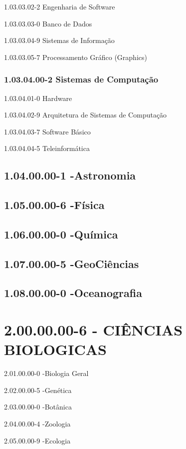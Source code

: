 1.03.03.02-2 Engenharia de Software

1.03.03.03-0 Banco de Dados

1.03.03.04-9 Sistemas de Informação

1.03.03.05-7 Processamento Gráfico (Graphics)

\subsubsection*{1.03.04.00-2 Sistemas de Computação}

1.03.04.01-0 Hardware

1.03.04.02-9 Arquitetura de Sistemas de Computação

1.03.04.03-7 Software Básico

1.03.04.04-5 Teleinformática

\subsection*{1.04.00.00-1 -Astronomia}

\subsection*{1.05.00.00-6 -Física}

\subsection*{1.06.00.00-0 -Química}

\subsection*{1.07.00.00-5 -GeoCiências}

\subsection*{1.08.00.00-0 -Oceanografia}

\section*{2.00.00.00-6 - CIÊNCIAS BIOLOGICAS}

2.01.00.00-0 -Biologia Geral

2.02.00.00-5 -Genética

2.03.00.00-0 -Botânica

2.04.00.00-4 -Zoologia

2.05.00.00-9 -Ecologia

